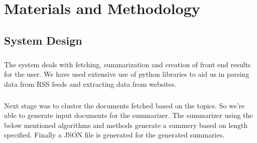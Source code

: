 \chapter{Materials and Methodology}
\section{System Design}
\paragraph{} The system deals with fetching, summarization and creation of front end results for the user. We have used extensive use of python libraries to aid us in parsing data from RSS feeds and extracting data from websites. 
\paragraph{} Next stage was to cluster the documents fetched based on the topics. So we're able to generate input documents for the summarizer. The summarizer using the below mentioned algorithms and methods generate a summery based on length specified. Finally a JSON file is generated for the generated summaries. 
